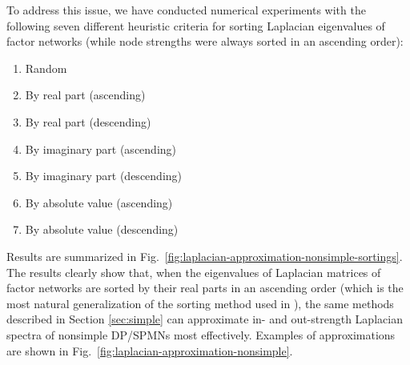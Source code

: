 \documentclass{article}
\begin{document}
To address this issue, we have conducted numerical experiments with
the following seven different heuristic criteria for sorting Laplacian
eigenvalues of factor networks (while node strengths were always
sorted in an ascending order):
\begin{enumerate}
\item Random
\item By real part (ascending)
\item By real part (descending)
\item By imaginary part (ascending)
\item By imaginary part (descending)
\item By absolute value (ascending)
\item By absolute value (descending)
\end{enumerate}
Results are summarized in
Fig.~\ref{fig:laplacian-approximation-nonsimple-sortings}. The results
clearly show that, when the eigenvalues of Laplacian matrices of
factor networks are sorted by their real parts in an ascending order
(which is the most natural generalization of the sorting method used
in \cite{sayama2016estimation}), the same methods described in Section
\ref{sec:simple} can approximate in- and out-strength Laplacian
spectra of nonsimple DP/SPMNs most effectively. Examples of
approximations are shown in
Fig.~\ref{fig:laplacian-approximation-nonsimple}.
\end{document}
